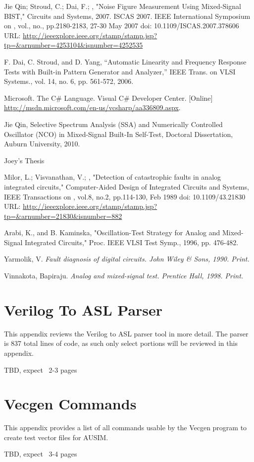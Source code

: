 \documentclass[12pt]{report}
\begin{document}
\begin{thebibliography}{99}
 Jie Qin; Stroud, C.; Dai, F.; , "Noise Figure Measurement Using Mixed-Signal BIST," Circuits and Systems, 2007. ISCAS 2007. IEEE International Symposium on , vol., no., pp.2180-2183, 27-30 May 2007 doi: 10.1109/ISCAS.2007.378606 URL: \url{http://ieeexplore.ieee.org/stamp/stamp.jsp?tp=&arnumber=4253104&isnumber=4252535}

 F. Dai, C. Stroud, and D. Yang, “Automatic Linearity and Frequency Response Tests with Built-in Pattern Generator and Analyzer,”  IEEE Trans. on VLSI Systems., vol. 14, no. 6, pp. 561-572, 2006.

 Microsoft. The C\# Language. Visual C\# Developer Center. [Online] \url{http://msdn.microsoft.com/en-us/vcsharp/aa336809.aspx}.

 Jie Qin, Selective Spectrum Analysis (SSA) and Numerically Controlled Oscillator (NCO) in Mixed-Signal Built-In Self-Test, Doctoral Dissertation, Auburn University, 2010.

 Joey's Thesis

 Milor, L.; Visvanathan, V.; , "Detection of catastrophic faults in analog integrated circuits," Computer-Aided Design of Integrated Circuits and Systems, IEEE Transactions on , vol.8, no.2, pp.114-130, Feb 1989 doi: 10.1109/43.21830 URL: \url{http://ieeexplore.ieee.org/stamp/stamp.jsp?tp=&arnumber=21830&isnumber=882}

 Arabi, K., and B. Kaminska, "Oscillation-Test Strategy for Analog and Mixed-Signal Integrated Circuits," Proc. IEEE VLSI Test Symp.,  1996, pp. 476-482.

 Yarmolik, V. \em{Fault diagnosis of digital circuits}. John Wiley & Sons, 1990. Print.

 Vinnakota, Bapiraju. \em{Analog and mixed-signal test}. Prentice Hall, 1998. Print.


\label{Bibliography}
\end{thebibliography}

\appendix
{}

\chapter{Verilog To ASL Parser}
\label{apdx:VerilogToASL}
This appendix reviews the Verilog to ASL parser tool in more detail.  The parser is 837 total lines of code, as such only select portions will be reviewed in this appendix.  

TBD, expect ~2-3 pages

\chapter{Vecgen Commands}
\label{apdx:Vecgen}
This appendix provides a list of all commands usable by the Vecgen program to create test vector files for AUSIM.

TBD, expect ~3-4 pages
\end{document}
